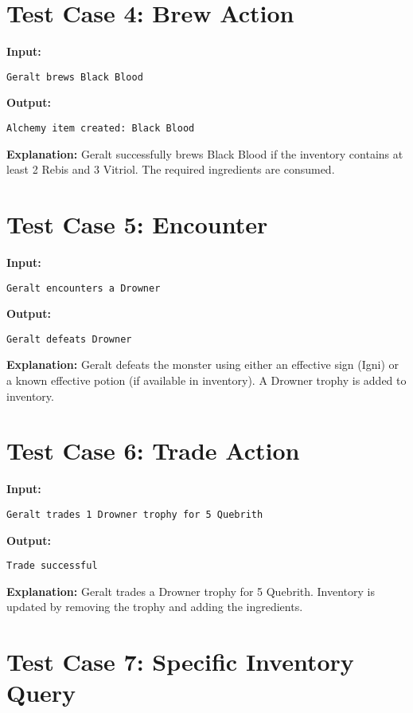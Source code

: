 \documentclass{article}
\begin{document}
\section*{Test Case 4: Brew Action}

\textbf{Input:}
\begin{lstlisting}
Geralt brews Black Blood
\end{lstlisting}

\textbf{Output:}
\begin{lstlisting}
Alchemy item created: Black Blood
\end{lstlisting}

\textbf{Explanation:} Geralt successfully brews Black Blood if the inventory contains at least 2 Rebis and 3 Vitriol. The required ingredients are consumed.

\section*{Test Case 5: Encounter}

\textbf{Input:}
\begin{lstlisting}
Geralt encounters a Drowner
\end{lstlisting}

\textbf{Output:}
\begin{lstlisting}
Geralt defeats Drowner
\end{lstlisting}

\textbf{Explanation:} Geralt defeats the monster using either an effective sign (Igni) or a known effective potion (if available in inventory). A Drowner trophy is added to inventory.

\section*{Test Case 6: Trade Action}

\textbf{Input:}
\begin{lstlisting}
Geralt trades 1 Drowner trophy for 5 Quebrith
\end{lstlisting}

\textbf{Output:}
\begin{lstlisting}
Trade successful
\end{lstlisting}

\textbf{Explanation:} Geralt trades a Drowner trophy for 5 Quebrith. Inventory is updated by removing the trophy and adding the ingredients.

\section*{Test Case 7: Specific Inventory Query}
\end{document}
